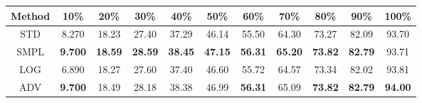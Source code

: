 \documentclass{standalone}
\begin{document}
\begin{tabular}{c|cccccccccc}
      \toprule
      Method & 10\% & 20\% & 30\% & 40\% & 50\% & 60\% & 70\% & 80\% & 90\% & 100\% \\
      \midrule
STD & 8.270 & 18.23 & 27.40 & 37.29 & 46.14 & 55.50 & 64.30 & 73.27 & 82.09 & 93.70\\
SMPL & \textbf{9.700} & \textbf{18.59} & \textbf{28.59} & \textbf{38.45} & \textbf{47.15} & \textbf{56.31} & \textbf{65.20} & \textbf{73.82} & \textbf{82.79} & 93.71\\
LOG & 6.890 & 18.27 & 27.60 & 37.40 & 46.60 & 55.72 & 64.57 & 73.34 & 82.02 & 93.81\\
ADV & \textbf{9.700} & 18.49 & 28.18 & 38.38 & 46.99 & \textbf{56.31} & 65.09 & \textbf{73.82} & \textbf{82.79} & \textbf{94.00}\\
  \bottomrule
\end{tabular}
\end{document}
